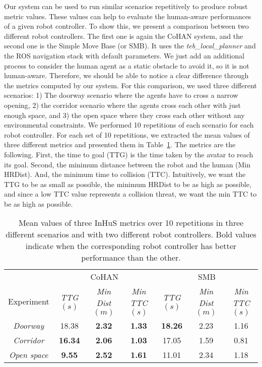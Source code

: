 Our system can be used to run similar scenarios repetitively to produce robust metric values. These values can help to evaluate the human-aware performances of a given robot controller. To show this, we present a comparison between two different robot controllers. The first one is again the CoHAN system, and the second one is the Simple Move Base (or SMB). It uses the \textit{teb\_local\_planner} and the ROS navigation stack with default parameters. We just add an additional process to consider the human agent as a static obstacle to avoid it, so it is not human-aware. Therefore, we should be able to notice a clear difference through the metrics computed by our system. For this comparison, we used three different scenarios: 1) The doorway scenario where the agents have to cross a narrow opening, 2) the corridor scenario where the agents cross each other with just enough space, and 3) the open space where they cross each other without any environmental constraints. We performed 10 repetitions of each scenario for each robot controller. For each set of 10 repetitions, we extracted the mean values of three different metrics and presented them in Table~\ref{tab:compare_robots}. The metrics are the following. First, the time to goal (TTG) is the time taken by the avatar to reach its goal. Second, the minimum distance between the robot and the human (Min HRDist). And, the minimum time to collision (TTC). Intuitively, we want the TTG to be as small as possible, the minimum HRDist to be as high as possible, and since a low TTC value represents a collision threat, we want the min TTC to be as high as possible. 

\begin{table}
\vspace{-0.2cm}
    \caption{Mean values of three InHuS metrics over 10 repetitions in three different scenarios and with two different robot controllers. Bold values indicate when the corresponding robot controller has better performance than the other.}
    \label{tab:compare_robots}
    \centering
    \begin{tabular}{|c|c|c|c|c|c|c|}
    \hline
     & \multicolumn{3}{c|}{CoHAN} & \multicolumn{3}{c|}{SMB}\\
    \cline{2-7}
    Experiment & \textit{TTG}$(s)$ & \textit{Min Dist}$(m)$&  \textit{Min TTC}$(s)$ 
    & \textit{TTG}$(s)$ & \textit{Min Dist}$(m)$ & \textit{Min TTC}$(s)$\\
    \hline
    \textit{Doorway} & 18.38 & \textbf{2.32} & \textbf{1.33} & \textbf{18.26} & 2.23 & 1.16\\
    \hline
    \textit{Corridor} & \textbf{16.34} & \textbf{2.06} & \textbf{1.03} & 17.05 & 1.59 & 0.81\\
    \hline
    \textit{Open space} & \textbf{9.55} & \textbf{2.52} & \textbf{1.61} & 11.01 & 2.34 & 1.18\\
    \hline
    \end{tabular}
\vspace{-0.3cm}  
\end{table}


